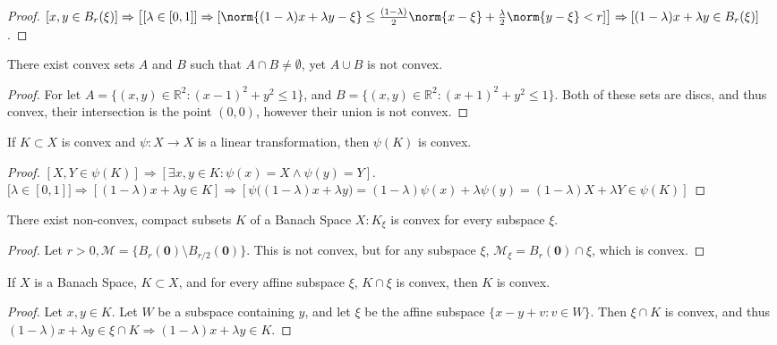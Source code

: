         \begin{proof}
        $[x,y\in B_{r}(\xi)]\Rightarrow\big[[\lambda \in [0,1]]\Rightarrow [\norm{(1-\lambda)x+\lambda y-\xi}\leq \frac{(1-\lambda)}{2}\norm{x-\xi}+\frac{\lambda}{2} \norm{y-\xi}< r]\big]\Rightarrow [(1-\lambda)x+\lambda y \in B_{r}(\xi)]$.
        \end{proof}
        \begin{theorem}
        There exist convex sets $A$ and $B$ such that $A\cap B \ne \emptyset$, yet $A\cup B$ is not convex.
        \end{theorem}
        \begin{proof}
        For let $A = \{(x,y)\in \mathbb{R}^2: (x-1)^2+y^2\leq 1\}$, and $B = \{(x,y)\in \mathbb{R}^2:(x+1)^2+y^2\leq 1\}$. Both of these sets are discs, and thus convex, their intersection is the point $(0,0)$, however their union is not convex.
        \end{proof}
        \begin{theorem}
        If $K\subset X$ is convex and $\psi:X\rightarrow X$ is a linear transformation, then $\psi(K)$ is convex.
        \end{theorem}
        \begin{proof}
        $[X,Y\in \psi(K)]\Rightarrow [\exists x,y\in K:\psi(x)=X\land \psi(y)=Y]$. $\big[\lambda \in [0,1]\big]\Rightarrow [(1-\lambda)x+\lambda y\in K]\Rightarrow [\psi\big((1-\lambda)x+\lambda y\big)=(1-\lambda)\psi(x)+\lambda\psi(y) = (1-\lambda)X+\lambda Y \in \psi(K)]$
        \end{proof}
        \begin{theorem}
        There exist non-convex, compact subsets $K$ of a Banach Space $X: K_{\xi}$ is convex for every subspace $\xi$.
        \end{theorem}
        \begin{proof}
        Let $r>0, \mathcal{M} = \{B_{r}(\mathbf{0})\setminus B_{r/2}(\mathbf{0})\}$. This is not convex, but for any subspace $\xi$, $\mathcal{M}_{\xi} = B_{r}(\mathbf{0})\cap \xi$, which is convex.
        \end{proof}
        \begin{theorem}
        If $X$ is a Banach Space, $K\subset X$, and for every affine subspace $\xi$, $K\cap \xi$ is convex, then $K$ is convex.
        \end{theorem}
        \begin{proof}
        Let $x,y\in K$. Let $W$ be a subspace containing $y$, and let $\xi$ be the affine subspace $\{x-y+v:v\in W\}$. Then $\xi\cap K$ is convex, and thus $(1-\lambda)x+\lambda y \in \xi \cap K \Rightarrow (1-\lambda)x+\lambda y \in K$.
        \end{proof}
